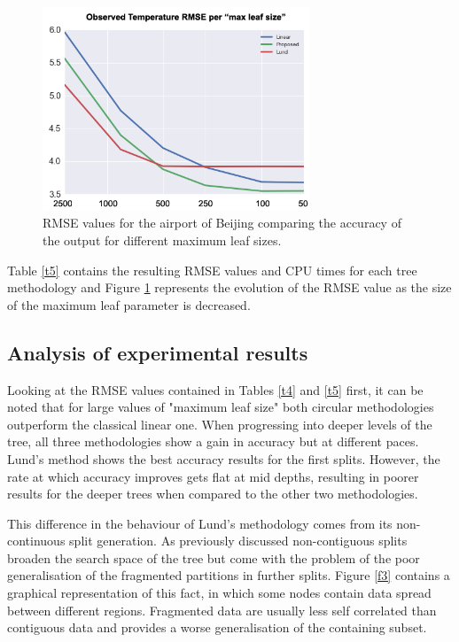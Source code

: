 \documentclass[times,twocolumn,final,authoryear]{elsarticle}
\begin{document}
\begin{figure}
  \includegraphics[width=8cm]{airports_fig.png}
\caption{RMSE values for the airport of Beijing comparing the accuracy of the output for different maximum leaf sizes.}
\label{f_tbn2}
\end{figure}

Table \ref{t5} contains the resulting RMSE values and CPU times for each tree methodology and Figure \ref{f_tbn2} represents the evolution of the RMSE value as the size of the maximum leaf parameter is decreased.

\subsection{Analysis of experimental results}

Looking at the RMSE values contained in Tables \ref{t4} and \ref{t5} first, it can be noted that for large values of "maximum leaf size" both circular methodologies outperform the classical linear one. When progressing into deeper levels of the tree, all three methodologies show a gain in accuracy but at different paces. Lund's method shows the best accuracy results for the first splits. However, the rate at which accuracy improves gets flat at mid depths, resulting in poorer results for the deeper trees when compared to the other two methodologies. 

This difference in the behaviour of Lund's methodology comes from its non-continuous split generation. As previously discussed non-contiguous splits broaden the search space of the tree but come with the problem of the poor generalisation of the fragmented partitions in further splits. Figure \ref{f3} contains a graphical representation of this fact, in which some nodes contain data spread between different regions. Fragmented data are usually less self correlated than contiguous data and provides a worse generalisation of the containing subset. 
\end{document}

